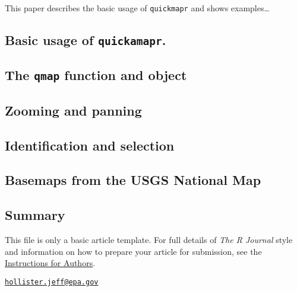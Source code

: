 This paper describes the basic usage of \texttt{quickmapr} and shows
examples\ldots{}

\subsection{Basic usage of
\texttt{quickamapr}.}\label{basic-usage-of-quickamapr.}

\subsection{The \texttt{qmap} function and
object}\label{the-qmap-function-and-object}

\subsection{Zooming and panning}\label{zooming-and-panning}

\subsection{Identification and
selection}\label{identification-and-selection}

\subsection{Basemaps from the USGS National
Map}\label{basemaps-from-the-usgs-national-map}

\subsection{Summary}\label{summary}

This file is only a basic article template. For full details of
\emph{The R Journal} style and information on how to prepare your
article for submission, see the
\href{https://journal.r-project.org/share/author-guide.pdf}{Instructions
for Authors}.



\address{%
Jeffrey W. Hollister\\
U.S. Environmental Protection Agency\\
Office of Research and Development\\ National Health and Environmental Effects Research Laboratory\\ Atlantic Ecology Division\\ 27 Tarzwell Drive\\ Narragansett, RI 02882\\
}
\href{mailto:hollister.jeff@epa.gov}{\nolinkurl{hollister.jeff@epa.gov}}


